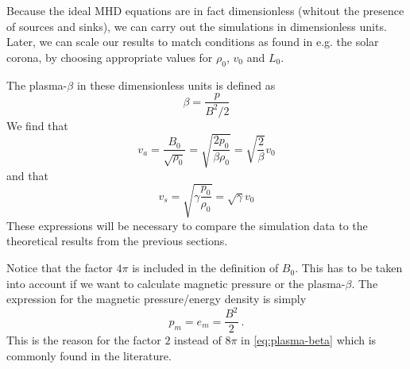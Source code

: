 Because the ideal MHD equations are in fact dimensionless (whitout the presence of sources and sinks), we can carry out the simulations in dimensionless units. 
Later, we can scale our results to match conditions as found in e.g. the solar corona, by choosing appropriate values for $\rho_0$, $v_0$ and $L_0$.

The plasma-$\beta$ in these dimensionless units is defined as
\begin{equation}
	\beta = \frac{p}{B^2/2}
	\label{eq:plasma-beta}
\end{equation}
We find that
\begin{equation}
	v_a = \frac{B_0}{\sqrt{\rho_0}} = \sqrt{ \frac{2p_0}{\beta\rho_0}} = \sqrt{ \frac{2}{\beta}}v_0
	\label{eq:Alfven-code-units}
\end{equation}
and that
\begin{equation}
	v_s = \sqrt{ \gamma\frac{p_0}{\rho_0}} = \sqrt{\gamma}v_0
	\label{eq:sound-code-units}
\end{equation}
These expressions will be necessary to compare the simulation data to the theoretical results from the previous sections.

Notice that the factor $4\pi$ is included in the definition of $B_0$. This has to be taken into account if we want to calculate magnetic pressure or the plasma-$\beta$.
The expression for the magnetic pressure/energy density is simply
\begin{equation}
	p_m = e_m = \frac{B^2}{2} \ .
	\label{eq:magnetic-pressure}
\end{equation}
This is the reason for the factor $2$ instead of $8\pi$ in \cref{eq:plasma-beta} which is commonly found in the literature.

